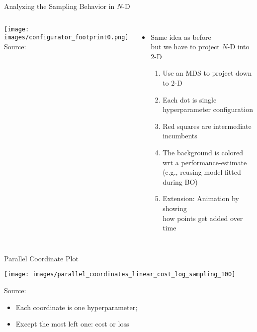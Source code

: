 \begin{frame}[c]{Analyzing the Sampling Behavior in $N$-D}


\begin{columns}
	
	\begin{center}
		\texttt{[image: images/configurator\_footprint0.png]}\\
		Source: 
	\end{center}
	
	
	\begin{itemize}
		\item Same idea as before\\
		 but we have to project $N$-D into $2$-D
		 \pause
		\begin{enumerate}
			\item Use an MDS to project down to $2$-D
					 \pause
			\item Each dot is single hyperparameter configuration
					 \pause
			\item Red squares are intermediate incumbents
					 \pause
			\item The background is colored wrt a performance-estimate\\ (e.g., reusing model fitted during BO) 
					 \pause
			\item Extension: Animation by showing\\ how points get added over time
		\end{enumerate}
	\end{itemize}
	
\end{columns}

\end{frame}
\begin{frame}[c]{Parallel Coordinate Plot }

\centering
\texttt{[image: images/parallel\_coordinates\_linear\_cost\_log\_sampling\_100]}
\begin{flushright}
	Source:  
\end{flushright}

\begin{itemize}
	\item Each coordinate is one hyperparameter; 
	\item Except the most left one: cost or loss
\end{itemize}

\end{frame}
